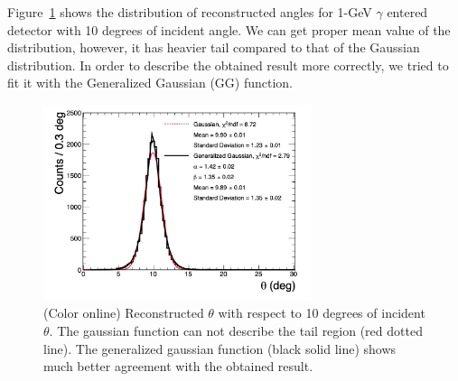 \documentclass[jkps,preprint,fleqn,showpacs,showkeys]{revtex4}
\newcommand{\XGB}{XGBoost}
\begin{document}

Figure~\ref{fig:angle_10degree} shows the distribution of reconstructed angles for 1-GeV $\gamma$ entered detector with 10 degrees of incident angle. %
We can get proper mean value of the distribution, however, it has heavier tail compared to that of the Gaussian distribution. In order to describe the obtained result more correctly, we tried to fit it with the Generalized Gaussian (GG) function. 

\begin{figure}[!hbt]
\includegraphics[width=0.7\textwidth]{figures/GG_fit.jpg}
\caption{ (Color online) Reconstructed $\theta$ with respect to 10 degrees of incident $\theta$. The gaussian function can not describe the tail region (red dotted line). The generalized gaussian function (black solid line) shows much better agreement with the obtained result.}
\label{fig:angle_10degree}
\end{figure}
\end{document}
